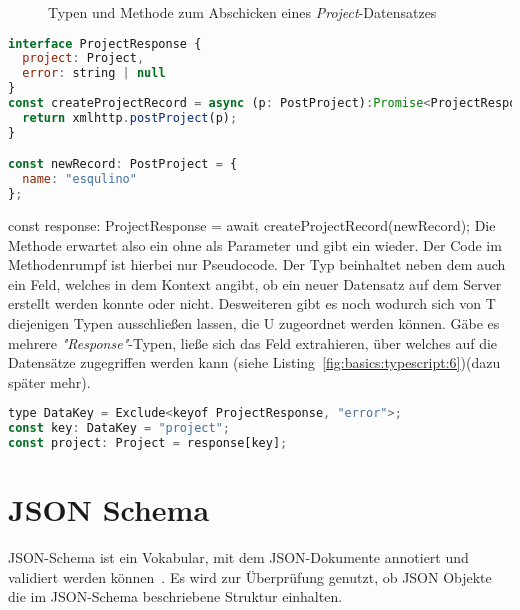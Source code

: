 \begin{figure}[h]
    
    \caption{Typen und Methode zum Abschicken eines \emph{Project}-Datensatzes}
    \label{fig:basics:typescript:5}
\end{figure}
\begin{lstlisting}[language=Javascript,float=h!,caption={Typen und Methode zum Abschicken eines \emph{Project}-Datensatzes}, label={fig:basics:typescript:5}]
interface ProjectResponse {
  project: Project,
  error: string | null
}
const createProjectRecord = async (p: PostProject):Promise<ProjectResponse> => {
  return xmlhttp.postProject(p);
}

const newRecord: PostProject = {
  name: "esqulino"
};
\end{lstlisting}
const response: ProjectResponse = await createProjectRecord(newRecord);
Die Methode  erwartet also ein  ohne  als Parameter und gibt ein  wieder.
Der Code im Methodenrumpf ist hierbei nur Pseudocode. Der Typ  beinhaltet neben dem  auch ein  Feld,
welches in dem Kontext angibt, ob ein neuer Datensatz auf dem Server erstellt werden konnte oder nicht.
Desweiteren gibt es noch  wodurch sich von T diejenigen Typen ausschließen lassen,
die U zugeordnet werden können. Gäbe es mehrere \emph{"Response"}-Typen, ließe sich das Feld extrahieren,
über welches auf die Datensätze zugegriffen werden kann (siehe Listing~\ref{fig:basics:typescript:6})(dazu später mehr).

\begin{lstlisting}[language=Javascript,float=h!,caption={Exclude zum Exkludieren von Schlüsseln}, label={fig:basics:typescript:6}]
type DataKey = Exclude<keyof ProjectResponse, "error">;
const key: DataKey = "project";
const project: Project = response[key];
\end{lstlisting}

\section{JSON Schema}
\label{sec:basics:jsonschema}
JSON-Schema ist ein Vokabular, mit dem JSON-Dokumente  annotiert und validiert werden können~\cite{json-schema}.
Es wird zur Überprüfung genutzt, ob JSON Objekte die im JSON-Schema beschriebene Struktur einhalten.

